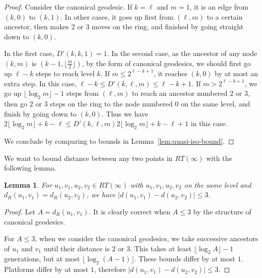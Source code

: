 \documentclass[11pt]{article}
\newtheorem{lem}{Lemma}
\begin{document}
\begin{proof}
Consider the canonical geodesic. If $k = \ell$ and $m=1$, it is an edge from $(k,0)$ to $(k,1)$. In other cases, it goes up first from $(\ell,m)$ to a certain ancestor, then makes $2$ or $3$ moves on the ring, and finished by going straight down to $(k,0)$.

In the first case, $D'(k,k,1)=1$. In the second case, as the ancestor of any node $(k,m)$ is $(k-1, \lfloor \frac{m}{2} \rfloor)$, by the form of canonical geodesics, we should first go up $\ell - k$ steps to reach level $k$. If $m \leq 2^{\ell - k + 1}$, it reaches $(k,0)$ by at most an extra step. In this case, $\ell - k \leq D'(k,\ell,m) \leq \ell - k + 1$. If $m > 2^{\ell - k + 1}$, we go up $\lfloor \log_2 m \rfloor - 1$ steps from $(\ell,m)$ to reach an ancestor numbered $2$ or $3$, then go $2$ or $3$ steps on the ring to the node numbered $0$ on the same level, and finish by going down to $(k,0)$. Thus we have $2\lfloor \log_2 m \rfloor + k - \ell \leq D'(k,\ell,m) 2\lfloor \log_2 m \rfloor + k - \ell + 1$ in this case.

We conclude by comparing to bounds in Lemma~\ref{lem:quasi-iso-bound}.
\end{proof}
We want to bound distance between any two points in $RT(\infty)$ with the following lemma.

\begin{lem} \label{lem:dist-and-ring-dist}
For $u_1, v_1, u_2, v_2 \in RT(\infty)$ with $u_1,v_1,u_2,v_2$ on the same level and $d_R(u_1,v_1)=d_R(u_2,v_2)$, we have $|d(u_1,v_1)-d(u_2,v_2)| \leq 3$.
\end{lem}

\begin{proof}
Let $A=d_R(u_1,v_1)$. It is clearly correct when $A \leq 3$ by the structure of canonical geodesics.

For $A \leq 3$, when we consider the canonical geodesics, we take successive ancestors of $u_1$ and $v_1$ until their distance is $2$ or $3$. This takes at least $\lfloor \log_2 A \rfloor - 1$ generations, but at most $\lfloor \log_2 (A-1) \rfloor$. These bounds differ by at most $1$. Platforms differ by at most $1$, therefore $|d(u_1,v_1)-d(u_2,v_2)| \leq 3$.
\end{proof}
\end{document}
